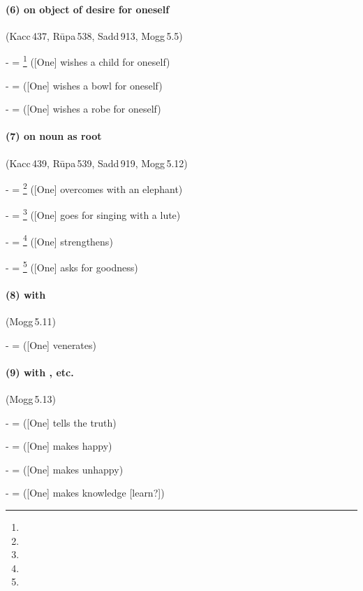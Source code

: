 \paragraph*{(6)  on object of desire for oneself} (Kacc\,437, R\=upa\,538, Sadd\,913, Mogg\,5.5)\par
-  = \footnote{} ([One] wishes a child for oneself)\par
-  =  ([One] wishes a bowl for oneself)\par
-  =  ([One] wishes a robe for oneself)\par

\paragraph*{(7)  on noun as root} (Kacc\,439, R\=upa\,539, Sadd\,919, Mogg\,5.12)\label{pacca:dnaya2}\par
-  = \footnote{} ([One] overcomes with an elephant)\par
-  = \footnote{} ([One] goes for singing with a lute)\par
-  = \footnote{} ([One] strengthens)\par
-  = \footnote{} ([One] asks for goodness)\par

\paragraph*{(8)  with } (Mogg\,5.11)\label{pacca:assa}\par
-  =  ([One] venerates)\par

\paragraph*{(9)  with , etc.} (Mogg\,5.13)\label{pacca:aapi}\par
-  =  ([One] tells the truth)\par
-  =  ([One] makes happy)\par
-  =  ([One] makes unhappy)\par
-  =  ([One] makes knowledge [learn?])\par


